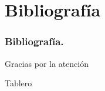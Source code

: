 \documentclass{beamer}
\begin{document}

\section{Bibliografía}

\begin{frame}[allowframebreaks]
	\frametitle{Bibliografía.}
	
	
	 
	
\end{frame}



\begin{frame}
\begin{center}
\Huge {\color{red} Gracias por la atención} 
\end{center}
    
\end{frame}
\begin{frame}{Tablero}
\end{frame}
\end{document}
